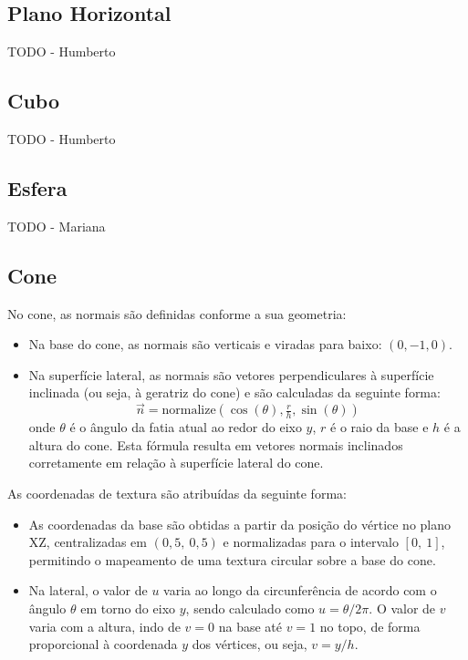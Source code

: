 \documentclass[12pt, a4paper]{article}
\begin{document}
\subsection{Plano Horizontal}

{\color{red} TODO - Humberto}

\subsection{Cubo}

{\color{red} TODO - Humberto}

\subsection{Esfera}

{\color{red} TODO - Mariana}

\subsection{Cone}

No cone, as normais são definidas conforme a sua geometria:

\begin{itemize}
    \item Na base do cone, as normais são verticais e viradas para baixo: $(0, -1, 0)$.
    \item Na superfície lateral, as normais são vetores perpendiculares à superfície
    inclinada (ou seja, à geratriz do cone) e são calculadas da seguinte forma:
\[
\vec{n} = \text{normalize}(\cos(\theta), \tfrac{r}{h}, \sin(\theta))
\]
onde \( \theta \) é o ângulo da fatia atual ao redor do eixo \( y \), \( r \) é o raio da
base e \( h \) é a altura do cone.
Esta fórmula resulta em vetores normais inclinados corretamente em relação à superfície
lateral do cone.
\end{itemize}

As coordenadas de textura são atribuídas da seguinte forma:

\begin{itemize}
    \item As coordenadas da base são obtidas a partir da posição do vértice no plano XZ,
    centralizadas em $(0{,}5,\ 0{,}5)$ e normalizadas para o intervalo $[0,\ 1]$,
    permitindo o mapeamento de uma textura circular sobre a base do cone.
    \item Na lateral, o valor de $u$ varia ao longo da circunferência de acordo com o ângulo
    $\theta$ em torno do eixo $y$, sendo calculado como $u = \theta / 2\pi$. O valor de $v$
    varia com a altura, indo de $v = 0$ na base até $v = 1$ no topo, de forma proporcional à
    coordenada $y$ dos vértices, ou seja, $v = y/h$.
\end{itemize}
\end{document}
